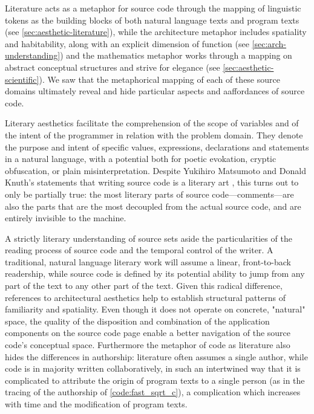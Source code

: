 Literature acts as a metaphor for source code through the mapping of linguistic tokens as the building blocks of both natural language texts and program texts (see \ref{sec:aesthetic-literature}), while the architecture metaphor includes spatiality and habitability, along with an explicit dimension of function (see \ref{sec:arch-understanding}) and the mathematics metaphor works through a mapping on abstract conceptual structures and strive for elegance (see \ref{sec:aesthetic-scientific}). We saw that the metaphorical mapping of each of these source domains ultimately reveal and hide particular aspects and aaffordances of source code.

Literary aesthetics facilitate the comprehension of the scope of variables and of the intent of the programmer in relation with the problem domain. They denote the purpose and intent of specific values, expressions, declarations and statements in a natural language, with a potential both for poetic evokation, cryptic obfuscation, or plain misinterpretation. Despite Yukihiro Matsumoto and Donald Knuth's statements that writing source code is a literary art \citep{knuth_literate_1984,matsumoto_treating_2007}, this turns out to only be partially true: the most literary parts of source code—comments—are also the parts that are the most decoupled from the actual source code, and are entirely invisible to the machine.

A strictly literary understanding of source sets aside the particularities of the reading process of source code and the temporal control of the writer. A traditional, natural language literary work will assume a linear, front-to-back readership, while source code is defined by its potential ability to jump from any part of the text to any other part of the text. Given this radical difference, references to architectural aesthetics help to establish structural patterns of familiarity and spatiality. Even though it does not operate on concrete, "natural" space, the quality of the disposition and combination of the application components on the source code page enable a better navigation of the source code's conceptual space. Furthermore the metaphor of code as literature also hides the differences in authorship: literature often assumes a single author, while code is in majority written collaboratively, in such an intertwined way that it is complicated to attribute the origin of program texts to a single person (as in the tracing of the authorship of \ref{code:fast_sqrt_c}), a complication which increases with time and the modification of program texts.

